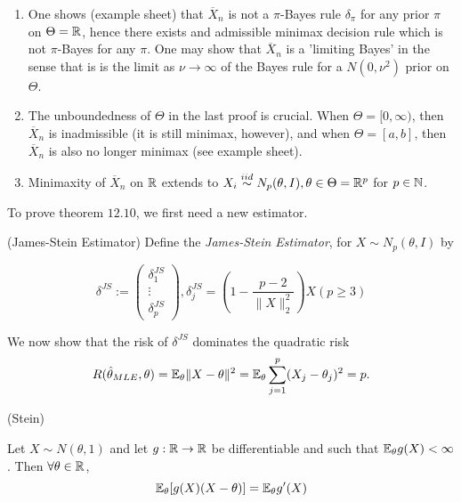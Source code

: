 \documentclass[a4paper]{article}
\begin{document}
\begin{remark}
	\begin{enumerate}[label=\roman*)]
		\item One shows (example sheet) that $\overline{X}_n$ is not a $\pi$-Bayes rule $\delta_{\pi}$ for any prior $\pi$ on $\Theta = \mathbb{R}$, hence there exists and admissible minimax decision rule which is not $\pi$-Bayes for any $\pi$. One may show that $\overline{X}_n$ is a 'limiting Bayes' in the sense that is is the limit as $\nu \to \infty$ of the Bayes rule for a $N(0, \nu^2)$ prior on $\Theta$.
		\item The unboundedness of $\Theta$ in the last proof is crucial. When  $\Theta = [0,\infty)$, then $\overline{X}_n$ is inadmissible (it is still minimax, however), and when $\Theta = [a,b]$, then $\overline{X}_n$ is also no longer minimax (see example sheet).
		\item Minimaxity of $\overline{X}_n$ on $\mathbb{R}$ extends to $X_i \stackrel{iid}{\sim} N_p(\theta, I), \theta\in \Theta = \mathbb{R}^{p}$ for $p \in \mathbb{N}$.
		
	\end{enumerate}
\end{remark}

To prove theorem $12.10$, we first need a new estimator.

\begin{defn} (James-Stein Estimator)
	Define the \textit{James-Stein Estimator}, for $X \sim N_p(\theta, I)$ by

	 \[
		 \delta^{JS} := \begin{pmatrix} \delta_1^{JS} \\ \vdots \\ \delta_p^{JS} \end{pmatrix}, \delta_j^{JS} = \left(1 - \frac{p-2}{\|X\|_2^2}\right) X (p\ge 3)
	\] 
\end{defn}

We now show that the risk of $\delta^{JS}$ dominates the quadratic risk
\[
	R(\hat{\theta}_{MLE}, \theta) = \mathbb{E}_{\theta} \|X - \theta\|^2 = \mathbb{E}_{\theta} \sum_{j=1}^{p}(X_j - \theta_j)^2 = p
.\] 

\newpage

\begin{lemma} (Stein)

	Let $X \sim N(\theta, 1)$ and let $g: \mathbb{R} \to \mathbb{R}$ be differentiable and such that $\mathbb{E}_{\theta} g(X) < \infty$. Then $\forall \theta \in \mathbb{R}$,
	\[
		\mathbb{E}_{\theta} [g(X)(X-\theta)] = \mathbb{E}_{\theta} g'(X)
	\] 
	
\end{lemma}
\end{document}
